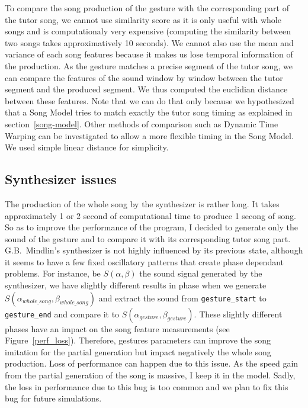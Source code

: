 \documentclass{report}
\begin{document}
To compare the song production of the gesture with the corresponding part of the
tutor song, we cannot use similarity score as it is only useful with whole songs
\parencite{tchernichovski_procedure_2000} and is computationaly very expensive
(computing the similarity between two songs takes approximatively 10 seconds).
We cannot also use the mean and variance of each song features because it makes
us lose temporal information of the production. As the gesture matches a precise
segment of the tutor song, we can compare the features of the sound window by
window between the tutor segment and the produced segment. We thus computed the
euclidian distance between these features. Note that we can do that only because
we hypothesized that a Song Model tries to match exactly the tutor song timing
as explained in section~\ref{song-model}. Other methods of comparison such as
Dynamic Time Warping can be investigated to allow a more flexible timing in the
Song Model. We used simple linear distance for simplicity.

\subsection{Synthesizer issues}

The production of the whole song by the synthesizer is rather long. It takes
approximately 1 or 2 second of computational time to produce 1 secong of song.
So as to improve the performance of the program, I decided to generate only the
sound of the gesture and to compare it with its corresponding tutor song part.
G.B.~Mindlin's synthesizer is not highly influenced by its previous state,
although it seems to have a few fixed oscillatory patterns that create phase
dependant problems. For instance, be $S(\alpha,\beta)$ the sound signal
generated by the synthesizer, we have slightly different results in phase when
we generate $S(\alpha_{whole\_song}, \beta_{whole\_song})$ and extract the sound
from \texttt{gesture\_start} to \texttt{gesture\_end} and compare it to
$S(\alpha_{gesture}, \beta_{gesture})$. These slightly different phases have an
impact on the song feature measurements (see Figure~\ref{perf_loss}). Therefore,
gestures parameters can improve the song imitation for the partial generation
but impact negatively the whole song production. Loss of performance can happen
due to this issue. As the speed gain from the partial generation of the song is
massive, I keep it in the model. Sadly, the loss in performance due to this bug
is too common and we plan to fix this bug for future simulations.
\end{document}
